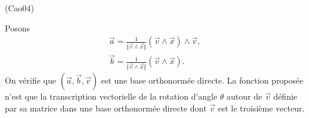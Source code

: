 \begin{tiny}(Cao04)\end{tiny} Posons 
\begin{multline*}
 \overrightarrow{a} 
 = \frac{1}{\Vert \overrightarrow{v} \wedge \overrightarrow{x}\Vert}\left( \overrightarrow{v} \wedge \overrightarrow{x}\right) \wedge \overrightarrow{v}, \\
 \overrightarrow{b} 
 = \frac{1}{\Vert \overrightarrow{v} \wedge \overrightarrow{x}\Vert}\left( \overrightarrow{v} \wedge \overrightarrow{x}\right).
\end{multline*}
On vérifie que 
$(\overrightarrow{a} , \overrightarrow{b} , \overrightarrow{v})$ est une base orthonormée directe. La fonction proposée n'est que la transcription vectorielle de la rotation d'angle $\theta$ autour de $\overrightarrow{v}$ définie par sa matrice dans une base orthonormée directe dont $\overrightarrow{v}$ est le troisième vecteur. 